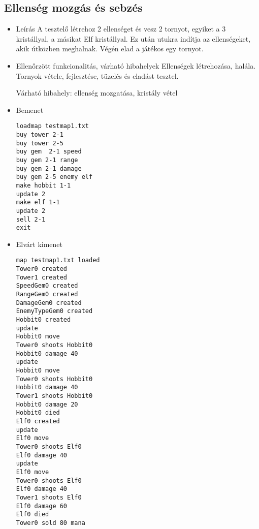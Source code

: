 \subsection{Ellenség mozgás és sebzés}
\begin{itemize}
\item Leírás\newline
A tesztelő létrehoz 2 ellenséget és vesz 2 tornyot, egyiket a 3 kristállyal, a másikat Elf kristállyal. Ez után utukra indítja az ellenségeket, akik útközben meghalnak. Végén elad a játékos egy tornyot.
\item Ellenőrzött funkcionalitás, várható hibahelyek \newline
Ellenségek létrehozása, halála. Tornyok vétele, fejlesztése, tüzelés és eladást tesztel. 

Várható hibahely: ellenség mozgatása, kristály vétel
\item Bemenet\newline
\begin{verbatim}
loadmap testmap1.txt
buy tower 2-1
buy tower 2-5
buy gem  2-1 speed 
buy gem 2-1 range 
buy gem 2-1 damage 
buy gem 2-5 enemy elf
make hobbit 1-1
update 2
make elf 1-1
update 2
sell 2-1
exit
\end{verbatim}
\item Elvárt kimenet\newline
\begin{verbatim}
map testmap1.txt loaded
Tower0 created
Tower1 created 
SpeedGem0 created
RangeGem0 created
DamageGem0 created
EnemyTypeGem0 created
Hobbit0 created
update
Hobbit0 move
Tower0 shoots Hobbit0
Hobbit0 damage 40
update
Hobbit0 move 
Tower0 shoots Hobbit0
Hobbit0 damage 40
Tower1 shoots Hobbit0
Hobbit0 damage 20
Hobbit0 died
Elf0 created
update
Elf0 move
Tower0 shoots Elf0
Elf0 damage 40
update
Elf0 move 
Tower0 shoots Elf0
Elf0 damage 40
Tower1 shoots Elf0
Elf0 damage 60
Elf0 died
Tower0 sold 80 mana
\end{verbatim}
\end{itemize}

